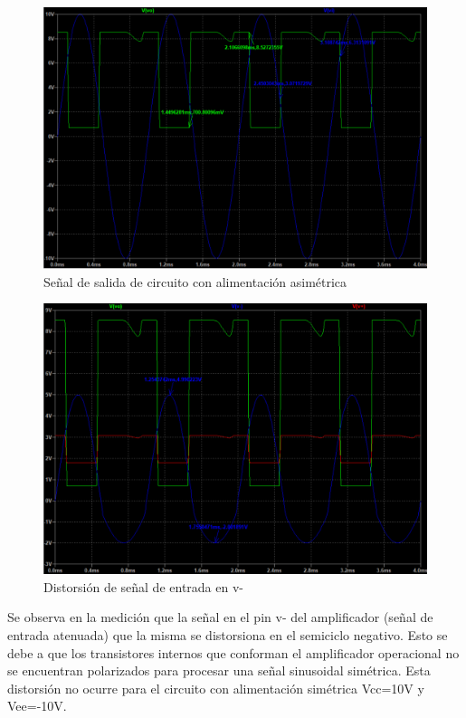 \begin{figure}[H]
    \centering
    \includegraphics[width=1.0\linewidth]{Secciones/Circuito4/Circuito 4 - Simulación con alimentación asimétrica.png}
    \caption{Señal de salida de circuito con alimentación asimétrica}
    \label{fig:SimulacionConAlimentacionAsimetrica}
\end{figure}
\begin{figure}[h!]
    \centering
    \includegraphics[width=1.0\linewidth]{Secciones/Circuito4/Circuito 4 - Vi atenuada.png}
    \caption{Distorsión de señal de entrada en v-}
    \label{fig:ViAtenuada}
\end{figure}
Se observa en la medición que la señal en el pin v- del amplificador (señal de entrada atenuada) que la misma se distorsiona en el semiciclo negativo. Esto se debe a que los transistores internos que conforman el amplificador operacional no se encuentran polarizados para procesar una señal sinusoidal simétrica.  Esta distorsión no ocurre para el circuito con alimentación simétrica Vcc=10V y Vee=-10V.

